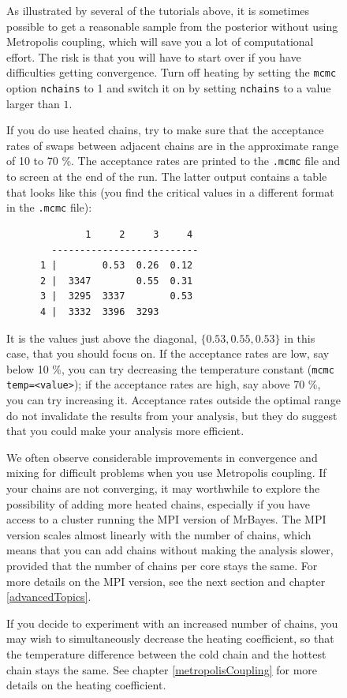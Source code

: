 \documentclass[12pt]{book}
\newcommand{\ttt}[1]{\texttt{#1}}
\begin{document}
\begin{figure}[h]
As illustrated by several of the tutorials above, it is sometimes possible to get a reasonable
sample from the posterior without using Metropolis coupling, which will save you a lot of
computational effort. The risk is that you will have to start over if you have difficulties getting
convergence. Turn off heating by setting the \ttt{mcmc} option \ttt{nchains} to 1 and switch it on
by setting \ttt{nchains} to a value larger than $1$.

If you do use heated chains, try to make sure that the acceptance rates of swaps between adjacent
chains are in the approximate range of 10 to 70 \%. The acceptance rates are printed to the
\ttt{.mcmc} file and to screen at the end of the run. The latter output contains a table that looks
like this (you find the critical values in a different format in the \ttt{.mcmc} file):

\footnotesize
\begin{singlespacing}
\begin{verbatim}
              1     2     3     4 
        --------------------------
      1 |        0.53  0.26  0.12 
      2 |  3347        0.55  0.31 
      3 |  3295  3337        0.53 
      4 |  3332  3396  3293       
\end{verbatim}
\end{singlespacing}
\normalsize

It is the values just above the diagonal, $\{0.53, 0.55, 0.53\}$ in this case, that you should
focus on. If the acceptance rates are low, say below 10 \%, you can try decreasing the temperature
constant (\ttt{mcmc temp=<value>}); if the acceptance rates are high, say above 70 \%, you can try
increasing it. Acceptance rates outside the optimal range do not invalidate the results from your
analysis, but they do suggest that you could make your analysis more efficient.

We often observe considerable improvements in convergence and mixing for difficult problems when
you use Metropolis coupling. If your chains are not converging, it may worthwhile to explore the
possibility of adding more heated chains, especially if you have access to a cluster running the
MPI version of MrBayes. The MPI version scales almost linearly with the number of chains, which
means that you can add chains without making the analysis slower, provided that the number of
chains per core stays the same. For more details on the MPI version, see the next section and
chapter \ref{advancedTopics}.

If you decide to experiment with an increased number of chains, you may wish to simultaneously
decrease the heating coefficient, so that the temperature difference between the cold chain and the
hottest chain stays the same. See chapter \ref{metropolisCoupling} for more details on the heating
coefficient.


\end{figure}
\end{document}
